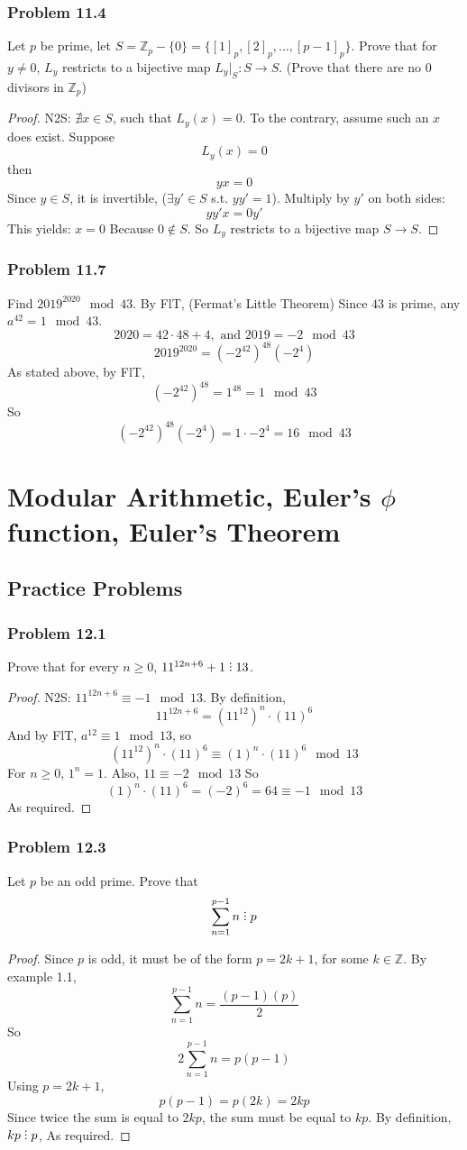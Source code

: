 \documentclass[hidelinks,12pt]{article}
\newcommand{\Z}{\mathbb{Z}}
\newcommand{\divby}{%
  \mathrel{\text{\vbox{\baselineskip.65ex\lineskiplimit0pt\hbox{.}\hbox{.}\hbox{.}}}}%
  }
\begin{document}
\subsubsection{Problem 11.4}
Let $p$ be prime, let $S=\Z_p-\{0\}=\{[1]_p,[2]_p,...,[p-1]_p\}$. Prove that for $y\neq0$, $L_y$ restricts to a bijective map $L_y|_S:S\to S$. (Prove that there are no 0 divisors in $\Z_p$)
\begin{proof}
N2S: $\nexists x\in S$, such that $L_y(x)=0$. To the contrary, assume such an $x$ does exist. \newline Suppose $$L_y(x)=0$$ then $$yx=0$$ Since $y\in S$, it is invertible, ($\exists y'\in S$ s.t. $yy'=1$). Multiply by $y'$ on both sides: $$yy'x=0y'$$ This yields: $x=0$ \scalebox{1.5}{\Lightning} Because $0\notin S$. So $L_y$ restricts to a bijective map $S\to S$.
\end{proof}
\subsubsection{Problem 11.7}
Find $2019^{2020}\mod{43}$.
\newline By FlT, (Fermat's Little Theorem) Since $43$ is prime, any $a^{42}=1\mod{43}$. $$2020=42\cdot48+4,\text{ and }2019=-2\mod{43}$$ $$2019^{2020}=(-2^{42})^{48}(-2^4)$$ As stated above, by FlT, $$(-2^{42})^{48}=1^{48}=1\mod{43}$$ So $$(-2^{42})^{48}(-2^4)=1\cdot-2^4=16\mod{43}$$
\newpage
\section{Modular Arithmetic, Euler’s $\phi$ function, Euler’s Theorem}
\subsection{Practice Problems}
\subsubsection{Problem 12.1}
Prove that for every $n\geq0$, $11^{12n+6}+1\divby13$.
\begin{proof}
N2S: $11^{12n+6}\equiv-1\mod{13}$. By definition, $$11^{12n+6}=(11^{12})^n\cdot(11)^6$$ And by FlT, $a^{12}\equiv1\mod{13}$, so $$(11^{12})^n\cdot(11)^6\equiv(1)^n\cdot(11)^6\mod{13}$$ For $n\geq0$, $1^n=1$. Also, $11\equiv-2\mod{13}$ So $$(1)^n\cdot(11)^6=(-2)^6=64\equiv-1\mod{13}$$ As required.
\end{proof}
\subsubsection{Problem 12.3}
Let $p$ be an odd prime. Prove that $$\sum_{n=1}^{p-1}n\divby p$$
\begin{proof}
Since $p$ is odd, it must be of the form $p=2k+1$, for some $k\in\Z$. By example 1.1, $$\sum_{n=1}^{p-1}n=\frac{(p-1)(p)}{2}$$ So $$2\sum_{n=1}^{p-1}n=p(p-1)$$ Using $p=2k+1$, $$p(p-1)=p(2k)=2kp$$ Since twice the sum is equal to $2kp$, the sum must be equal to $kp$. By definition, $kp\divby p$, As required.
\end{proof}
\end{document}
